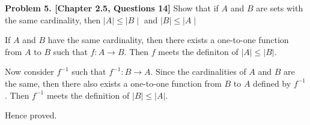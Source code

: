 \documentclass[addpoints]{exam}
\begin{document}
\begin{sloppypar}
\begin{questions}
\question
\textbf{Problem 5. [Chapter 2.5, Questions 14]}
    Show that if $A$ and $B$ are sets with the same cardinality, then $ \mid A \mid \leq \mid B \mid$  and $ \mid B \mid \leq \mid A \mid  $
\begin{solution}
    If $A$ and $B$ have the same cardinality, then there exists a one-to-one function from $A$ to $B$ such that $ f : A \rightarrow B $. Then $f$ meets the definiton of $ |A| \leq |B| $. 

    Now consider $ f^{-1} $ such that $ f^{-1} : B \rightarrow A $. Since the cardinalities of $A$ and $B$ are the same, then there also exists a one-to-one function from $B$ to $A$ defined by $ f^{-1} $. Then $ f^{-1} $ meets the definition of $ |B| \leq |A| $.

    Hence proved.
\end{solution}


\end{questions}
\end{sloppypar}
\end{document}
